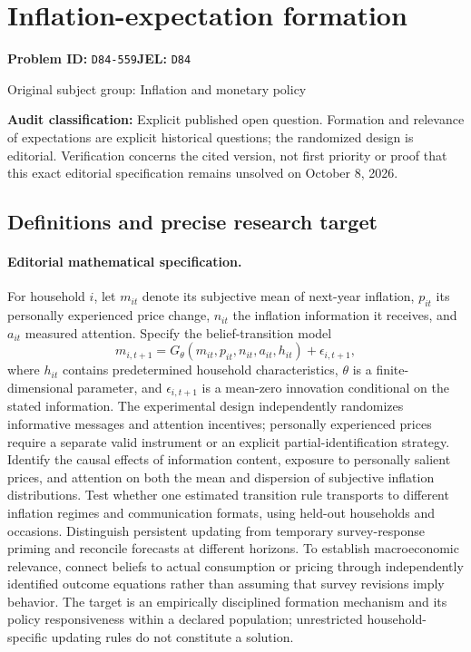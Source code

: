 \documentclass[11pt,a4paper]{article}
\begin{document}
\section*{Inflation-expectation formation}
\textbf{Problem ID:} \texttt{D84-559}\quad \textbf{JEL:} \texttt{D84}\par
\label{problem:OP-0243}
{\sffamily\small\color{muted}Original subject group: Inflation and monetary policy\par}
\label{definitions:problem:30007524}
\textbf{Audit classification:} Explicit published open question. Formation and relevance of expectations are explicit historical questions; the randomized design is editorial. Verification concerns the cited version, not first priority or proof that this exact editorial specification remains unsolved on October 8, 2026.
\subsection*{Definitions and precise research target}
\paragraph{Editorial mathematical specification.} For household \(i\), let \(m_{it}\) denote its subjective mean of next-year inflation, \(p_{it}\) its personally experienced price change, \(n_{it}\) the inflation information it receives, and \(a_{it}\) measured attention. Specify the belief-transition model
\[
m_{i,t+1}=G_\theta(m_{it},p_{it},n_{it},a_{it},h_{it})+\epsilon_{i,t+1},
\]
where \(h_{it}\) contains predetermined household characteristics, \(\theta\) is a finite-dimensional parameter, and \(\epsilon_{i,t+1}\) is a mean-zero innovation conditional on the stated information. The experimental design independently randomizes informative messages and attention incentives; personally experienced prices require a separate valid instrument or an explicit partial-identification strategy.
Identify the causal effects of information content, exposure to personally salient prices, and attention on both the mean and dispersion of subjective inflation distributions. Test whether one estimated transition rule transports to different inflation regimes and communication formats, using held-out households and occasions. Distinguish persistent updating from temporary survey-response priming and reconcile forecasts at different horizons. To establish macroeconomic relevance, connect beliefs to actual consumption or pricing through independently identified outcome equations rather than assuming that survey revisions imply behavior. The target is an empirically disciplined formation mechanism and its policy responsiveness within a declared population; unrestricted household-specific updating rules do not constitute a solution.
\end{document}
